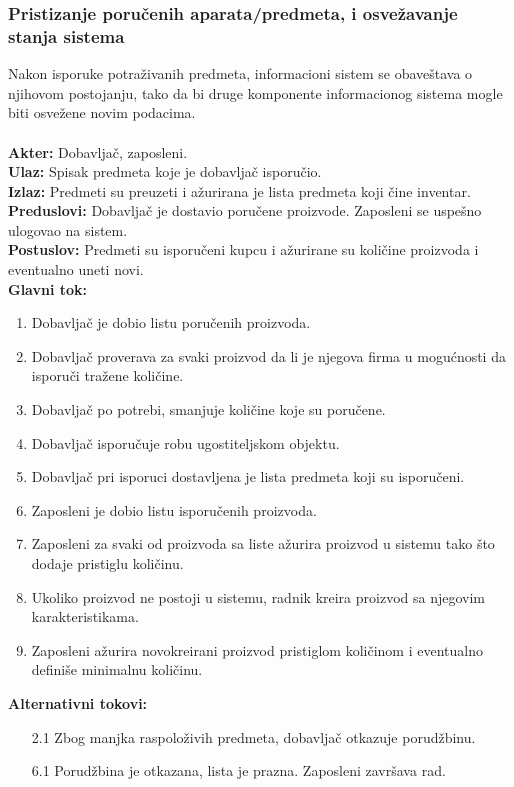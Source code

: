 \documentclass{article}
\begin{document}
\subsubsection{Pristizanje poručenih aparata/predmeta, i osvežavanje stanja sistema}
Nakon isporuke potraživanih predmeta, informacioni sistem se obaveštava o njihovom postojanju, tako da bi druge komponente informacionog sistema mogle biti osvežene novim podacima.\\\\
\textbf{Akter:} Dobavljač, zaposleni.\\
\textbf{Ulaz:} Spisak predmeta koje je dobavljač isporučio.\\
\textbf{Izlaz:} Predmeti su preuzeti i ažurirana je lista predmeta koji čine inventar.\\
\textbf{Preduslovi:} Dobavljač je dostavio poručene proizvode. Zaposleni se uspešno ulogovao na sistem.\\
\textbf{Postuslov:} Predmeti su isporučeni kupcu i ažurirane su količine proizvoda i eventualno uneti novi.\\
\textbf{Glavni tok:} 
\begin{enumerate}
	\item Dobavljač je dobio listu poručenih proizvoda.
	\item Dobavljač proverava za svaki proizvod da li je njegova firma u mogućnosti da isporuči tražene količine.
	\item Dobavljač po potrebi, smanjuje količine koje su poručene.
	\item Dobavljač isporučuje robu ugostiteljskom objektu.
	\item Dobavljač pri isporuci dostavljena je lista predmeta koji su isporučeni.  
    \item Zaposleni je dobio listu isporučenih proizvoda.
	\item Zaposleni za svaki od proizvoda sa liste ažurira proizvod u sistemu tako što dodaje pristiglu količinu.
	\item Ukoliko proizvod ne postoji u sistemu, radnik kreira proizvod sa njegovim karakteristikama.
	\item Zaposleni ažurira novokreirani proizvod pristiglom količinom i eventualno definiše minimalnu količinu. 
\end{enumerate}
\textbf{Alternativni tokovi:} 
\begin{itemize}
\item [2.1] Zbog manjka raspoloživih predmeta, dobavljač otkazuje porudžbinu.
\item [6.1] Porudžbina je otkazana, lista je prazna. Zaposleni završava rad.
\end{itemize}
\end{document}
